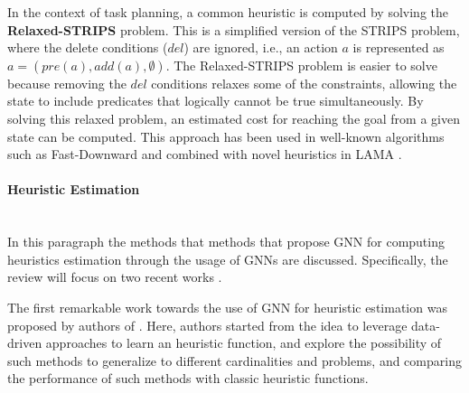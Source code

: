 In the context of task planning, a common heuristic is computed by solving the \textbf{Relaxed-STRIPS} problem. This is a simplified version of the STRIPS problem, where the delete conditions ($del$) are ignored, i.e., an action $a$ is represented as $a = \left(pre(a), add(a), \emptyset \right)$. The Relaxed-STRIPS problem is easier to solve because removing the $del$ conditions relaxes some of the constraints, allowing the state to include predicates that logically cannot be true simultaneously. By solving this relaxed problem, an estimated cost for reaching the goal from a given state can be computed. This approach has been used in well-known algorithms such as Fast-Downward \cite{helmert2006fast} and combined with novel heuristics in LAMA \cite{richter2010lama}.

\paragraph*{Heuristic Estimation}\mbox{}\\
In this paragraph the methods that methods that propose GNN for computing heuristics estimation through the usage of GNNs are discussed. Specifically, the review will focus on two recent works \cite{shen2020learning,chen2024learning}.

The first remarkable work towards the use of GNN for heuristic estimation was proposed by authors of \cite{shen2020learning}. Here, authors started from the idea to leverage data-driven approaches to learn an heuristic function, and explore the possibility of such methods to generalize to different cardinalities and problems, and comparing the performance of such methods with classic heuristic functions.

